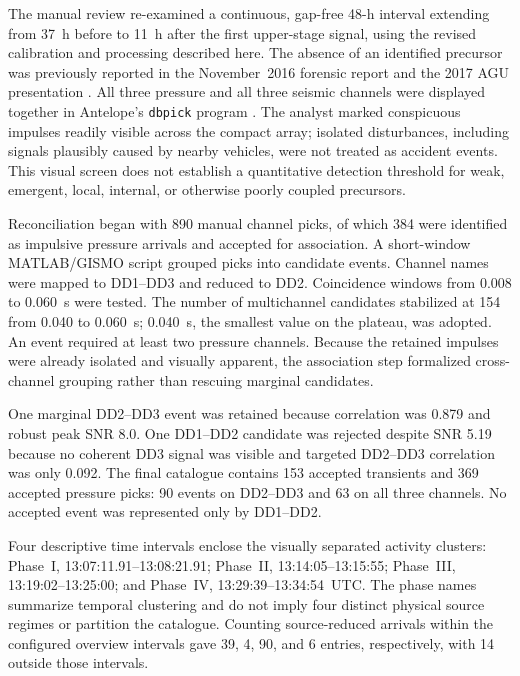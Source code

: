 \documentclass[]{seismica}
\begin{document}
The manual review re-examined a continuous, gap-free 48-h interval extending
from 37~h before to 11~h after the first upper-stage signal, using the revised
calibration and processing described here. The absence of an identified
precursor was previously reported in the November~2016 forensic report
\citep{thompson_mcnutt_fireball_2016} and the 2017 AGU presentation
\citep{thompson_agu_falcon9_2017}. All three pressure and all three seismic
channels were displayed together in Antelope's \texttt{dbpick} program
\citep{brtt_antelope}. The analyst marked conspicuous impulses readily visible
across the compact array; isolated disturbances, including signals plausibly
caused by nearby vehicles, were not treated as accident events. This visual
screen does not establish a quantitative detection threshold for weak,
emergent, local, internal, or otherwise poorly coupled precursors.

Reconciliation began with 890 manual channel picks, of which 384 were
identified as impulsive pressure arrivals and accepted for association. A short-window MATLAB/GISMO script
\citep{thompson_gismo_2017} grouped picks into candidate events. Channel names
were mapped to DD1--DD3 and reduced to
DD2. Coincidence windows from 0.008 to 0.060~s were tested. The number of
multichannel candidates stabilized at 154 from 0.040 to 0.060~s; 0.040~s, the
smallest value on the plateau, was adopted. An event required at least two
pressure channels. Because the retained impulses were already isolated and
visually apparent, the association step formalized cross-channel grouping
rather than rescuing marginal candidates.

One marginal DD2--DD3 event was retained because correlation was 0.879 and
robust peak SNR 8.0. One DD1--DD2 candidate was rejected despite SNR 5.19
because no coherent DD3 signal was visible and targeted DD2--DD3 correlation
was only 0.092. The final catalogue contains 153 accepted transients and 369
accepted pressure picks: 90 events on DD2--DD3 and 63 on all three channels.
No accepted event was represented only by DD1--DD2.

Four descriptive time intervals enclose the visually separated activity
clusters: Phase~I, 13:07:11.91--13:08:21.91; Phase~II,
13:14:05--13:15:55; Phase~III, 13:19:02--13:25:00; and Phase~IV,
13:29:39--13:34:54~UTC. The phase names summarize temporal clustering and do
not imply four distinct physical source regimes or partition the catalogue.
Counting source-reduced arrivals within the configured overview intervals
gave 39, 4, 90, and 6 entries, respectively, with 14 outside those intervals.
\end{document}
